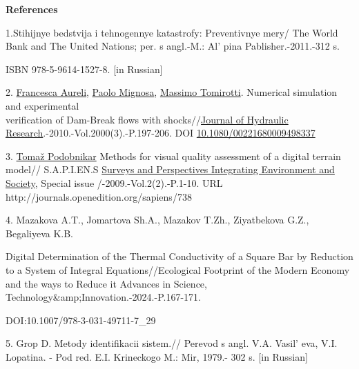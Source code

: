 \begin{center}
{\bfseries References}
\end{center}

\begin{references}
1.Stihijnye bedstvija i tehnogennye katastrofy: Preventivnye mery/ The
World Bank and The United Nations; per. s angl.-M.:
Al' pina Pablisher.-2011.-312 s.

ISBN 978-5-9614-1527-8. {[}in Russian{]}

2.
\href{https://www.researchgate.net/profile/Francesca-Aureli?_tp=eyJjb250ZXh0Ijp7ImZpcnN0UGFnZSI6InB1YmxpY2F0aW9uIiwicGFnZSI6InB1YmxpY2F0aW9uIn19}{Francesca
Aureli},
\href{https://www.researchgate.net/profile/Paolo-Mignosa?_tp=eyJjb250ZXh0Ijp7ImZpcnN0UGFnZSI6InB1YmxpY2F0aW9uIiwicGFnZSI6InB1YmxpY2F0aW9uIn19}{Paolo
Mignosa},
\href{https://www.researchgate.net/profile/Massimo-Tomirotti?_tp=eyJjb250ZXh0Ijp7ImZpcnN0UGFnZSI6InB1YmxpY2F0aW9uIiwicGFnZSI6InB1YmxpY2F0aW9uIn19}{Massimo
Tomirotti}. Numerical simulation and experimental \\verification of
Dam-Break flows with
shocks//\href{https://www.researchgate.net/journal/Journal-of-Hydraulic-Research-1814-2079?_tp=eyJjb250ZXh0Ijp7ImZpcnN0UGFnZSI6InB1YmxpY2F0aW9uIiwicGFnZSI6InB1YmxpY2F0aW9uIn19}{Journal
of Hydraulic Research}.-2010.-Vol.2000(3).-P.197-206. DOI
\href{http://dx.doi.org/10.1080/00221680009498337}{10.1080/00221680009498337}

3.
\href{https://www.researchgate.net/profile/Tomaz-Podobnikar?_tp=eyJjb250ZXh0Ijp7ImZpcnN0UGFnZSI6InB1YmxpY2F0aW9uIiwicGFnZSI6InB1YmxpY2F0aW9uIn19}{Tomaž
Podobnikar} Methods for visual quality assessment of a digital terrain
model// S.A.P.I.EN.S
\href{https://www.researchgate.net/journal/Surveys-and-Perspectives-Integrating-Environment-and-Society-1993-3819?_tp=eyJjb250ZXh0Ijp7ImZpcnN0UGFnZSI6InB1YmxpY2F0aW9uIiwicGFnZSI6InB1YmxpY2F0aW9uIn19}{Surveys
and Perspectives Integrating Environment and Society}, Special issue
/-2009.-Vol.2(2).-P.1-10. URL
http://journals.openedition.org/sapiens/738

4. Mazakova A.T., Jomartova Sh.A., Mazakov T.Zh., Ziyatbekova G.Z.,
Begaliyeva K.B.

Digital Determination of the Thermal Conductivity of a Square Bar by
Reduction to a System of Integral Equations//Ecological Footprint of the
Modern Economy and the ways to Reduce it Advances in Science,
Technology\&amp;Innovation.-2024.-P.167-171.

DOI:10.1007/978-3-031-49711-7\_29

5. Grop D. Metody identifikacii sistem.// Perevod s angl. V.A.
Vasil' eva, V.I. Lopatina. - Pod red. E.I. Krineckogo M.:
Mir, 1979.- 302 s. {[}in Russian{]}
\end{references}

